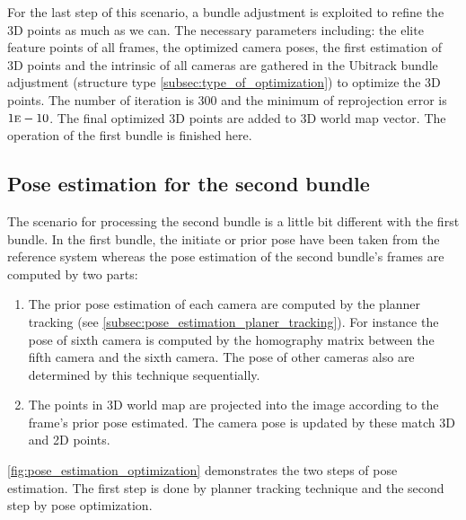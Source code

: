 For the last step of this scenario, a bundle adjustment is exploited to refine the 3D points as much as we can. The necessary parameters including: the elite feature points of all frames, the optimized camera poses, the first estimation of 3D points and the intrinsic of all cameras are gathered in the Ubitrack bundle adjustment (structure type \autoref{subsec:type_of_optimization}) to optimize the 3D points. The number of iteration is 300 and the minimum of reprojection error is $1\mbox{\textsc{e}}-10$. The final optimized 3D points are added to 3D world map vector. The operation of the first bundle is finished here.

\subsection{Pose estimation for the second bundle} \label{subsec:pose_second_bundle}
The scenario for processing the second bundle is a little bit different with the first bundle. In the first bundle, the initiate or prior pose have been taken from the reference system whereas the pose estimation of the second bundle's frames are computed by two parts:
\begin{enumerate}
\item The prior pose estimation of each camera are computed by the planner tracking (see \autoref{subsec:pose_estimation_planer_tracking}). For instance the pose of sixth camera is computed by the homography matrix between the fifth camera and the sixth camera. The pose of other cameras also are determined by this technique sequentially. 
\item The points in 3D world map are projected into the image according to the frame's prior pose estimated. The camera pose is updated by these match 3D and 2D points.
\end{enumerate}

\autoref{fig:pose_estimation_optimization} demonstrates the two steps of pose estimation. The first step is done by planner tracking technique and the second step by pose optimization.


